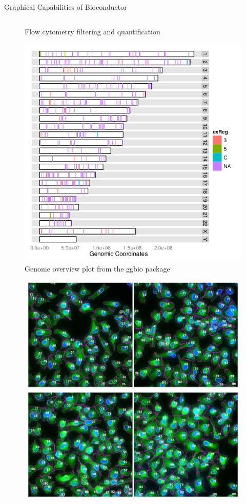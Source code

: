 \documentclass[final]{beamer}
\begin{document}
\begin{frame}[t]
\begin{columns}[t]
\begin{column}{0.48\linewidth}
\begin{block}{Graphical Capabilities of Bioconductor}
\begin{columns}[t]
\begin{column}{0.33\linewidth}
\begin{figure}
              \caption{Flow cytometry filtering and quantification}
            \end{figure}
            \begin{figure}
              \centering
              \includegraphics[width=0.85\linewidth]{stacked-darn}
              \caption{Genome overview plot from the ggbio package}
            \end{figure}
            \begin{figure}
              \centering
              \includegraphics[width=0.85\linewidth]{ebimage}

\end{figure}
\end{column}
\end{columns}
\end{block}
\end{column}
\end{columns}
\end{frame}
\end{document}
